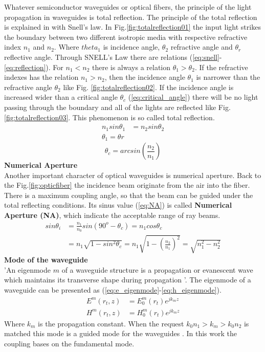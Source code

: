 Whatever semiconductor waveguides or optical fibers, the principle of the light propagation in waveguides is total reflection. The principle of the total reflection is explained in \cite{optical_waveguides_fibers} with Snell's law. In Fig.\ref{fig:totalreflection01} the input light strikes the boundary between two different isotropic media with respective refractive index $n_{1}$ and $n_{2}$. Where $theta_{1}$ is incidence angle, $\theta_{2}$ refractive angle and $\theta_{r}$ reflective angle. Through SNELL's Law there are relations (\ref{eq:snell}-\ref{eq:reflection}).  For $n_{1}<n_{2}$ there is  always a relation $\theta_{1}>\theta_{2}$.  If the refractive indexes has the relation $n_{1}>n_{2}$, then the incidence angle $\theta_{1}$ is narrower than the refractive angle $\theta_{2}$ like Fig. \ref{fig:totalreflection02}. If the incidence angle is increased wider than a critical angle $\theta_{c}$ (\ref{eq:critical_angle}) there will be no light passing through the boundary and all of the lights are reflected like Fig. \ref{fig:totalreflection03}. This phenomenon is so called total reflection.
\begin{align}
n_{1}sin\theta_{1}&=n_{2}sin\theta_{2}
\label{eq:snell}\\
\theta_{1}=\theta{r}
\label{eq:reflection}
\end{align}
\begin{equation}
\theta_{c}=arcsin(\frac{n_{2}}{n_{1}})
\label{eq:critical_angle}
\end{equation}
\textbf{ Numerical Aperture }\\
Another important character of optical waveguides is numerical aperture. Back to the Fig.\ref{fig:opticfiber} the incidence beam originate from the air into the fiber. There is a maximum coupling angle, so that the beam can be guided under the total reflecting conditions. Its sinus value (\ref{eq:NA}) is called \textbf{Numerical Aperture (NA)}, which indicate the acceptable range of ray beams.
\begin{align}
sin\theta_{i}&=\frac{n_{1}}{n_{0}}sin(90^{o}-\theta_{c})=n_{1}cos\theta_{c} \nonumber\\
&=n_{1}\sqrt{1-sin^{2}\theta_{c}}=n_{1}\sqrt{1-\left(\frac{n_{2}}{n_{1}}\right)^2}=\sqrt{n^2_{1}-n^2_{2}}
\label{eq:NA}
\end{align}
\textbf{Mode of the waveguide}\\
'An eigenmode $m$ of a waveguide structure is a propagation or evanescent wave which maintains its transverse shape during propagation '\cite{integrated_optics}. The eigenmode of a waveguide can be presented as (\ref{eq:e_eigenmode}-\ref{eq:h_eigenmode}). 
\begin{align}
E^{m}(r_{t},z)&=E^{m}_{0}(r_{t})e^{jk_{m}z}
\label{eq:e_eigenmode}\\
H^{m}(r_{t},z)&=H^{m}_{0}(r_{t})e^{jk_{m}z}
\label{eq:h_eigenmode}
\end{align}
Where $k_{m}$ is the propagation constant. When the request  $k_{0}n_{1}>k_{m}>k_{0}n_{2}$ is matched this mode is a guided mode for the waveguides \cite{script_FT_TET}. In this work the coupling bases on the fundamental mode.
